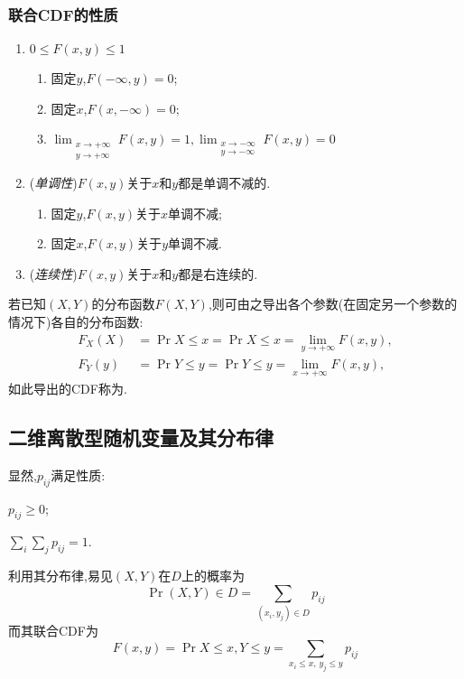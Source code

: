 \subsubsection{联合CDF的性质}
\begin{enumerate}
    \item $0\leq F(x,y )\leq 1$
          \begin{enumerate}
              \item 固定$y$,$F(-\infty,y ) = 0$;
              \item 固定$x$,$F(x,-\infty) = 0$;
              \item $\lim_{\substack{x\to +\infty\\y\to +\infty}}F(x,y ) = 1, \lim_{\substack{x\to -\infty\\y\to -\infty}}F(x,y) = 0$
          \end{enumerate}
    \item (\emph{单调性})$F(x,y )$关于$x$和$y$都是单调不减的.
          \begin{enumerate}
              \item 固定$y$,$F(x,y )$关于$x$单调不减;
              \item 固定$x$,$F(x,y )$关于$y$单调不减.
          \end{enumerate}
    \item (\emph{连续性})$F(x,y )$关于$x$和$y$都是右连续的.
\end{enumerate}
若已知$(X,Y)$的分布函数$F(X,Y)$,则可由之导出各个参数(在固定另一个参数的情况下)各自的分布函数:
\begin{align}
    F_X(X) & = \Pr{X\leq x } =\Pr{X\leq x} = \lim_{y\to +\infty}F(x,y), \\
    F_Y(y) & = \Pr{Y\leq y } =\Pr{Y\leq y} = \lim_{x\to +\infty}F(x,y),
\end{align}
如此导出的CDF称为.
\subsection{二维离散型随机变量及其分布律}
显然,$p_{ij}$满足性质:\;\;
\begin{enumerate*}
    \item $p_{ij}\geq 0$;
          \quad\item $\sum_i\sum_j p_{ij} = 1$.
\end{enumerate*}
利用其分布律,易见$(X,Y )$在$D$上的概率为
\begin{equation}
    \Pr{(X,Y)\in D} = \sum_{(x_i,y_j)\in D}p_{ij}
\end{equation}
而其联合CDF为
\begin{equation}
    F(x,y) = \Pr{X\leq x, Y\leq y } = \sum_{x_i\leq x,\,y_j\leq y}p_{ij}
\end{equation}
